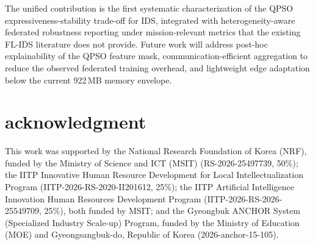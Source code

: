 \documentclass[conference]{IEEEtran}
\begin{document}
The unified contribution is the first systematic
characterization of the QPSO expressiveness-stability
trade-off for IDS, integrated with heterogeneity-aware
federated robustness reporting under mission-relevant
metrics that the existing FL-IDS literature does not provide.
Future work will address post-hoc explainability of the
QPSO feature mask, communication-efficient aggregation to
reduce the observed federated
training overhead, and lightweight edge adaptation below
the current 922\,MB memory envelope.










\section *{\textbf{acknowledgment}}
\vspace{-0.2cm}
This work was supported by the National Research Foundation of Korea (NRF), funded by the Ministry of Science and ICT (MSIT) (RS-2026-25497739, 50\%); the IITP Innovative Human Resource Development for Local Intellectualization Program (IITP-2026-RS-2020-II201612, 25\%); the IITP Artificial Intelligence Innovation Human Resources Development Program (IITP-2026-RS-2026-25549709, 25\%), both funded by MSIT; and the Gyeongbuk ANCHOR System (Specialized Industry Scale-up) Program, funded by the Ministry of Education (MOE) and Gyeongsangbuk-do, Republic of Korea (2026-anchor-15-105).

\balance




\end{document}
